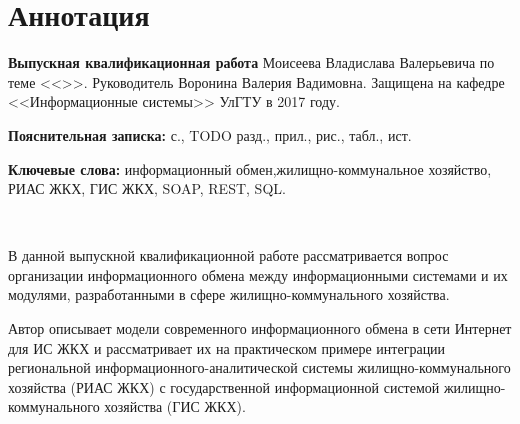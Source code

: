 
\section*{Аннотация}

\textbf{Выпускная квалификационная работа} Моисеева Владислава Валерьевича по теме <<\WorkName>>.
Руководитель Воронина Валерия Вадимовна.
Защищена на кафедре <<Информационные системы>> УлГТУ в 2017 году.

\textbf{Пояснительная записка:}  с.,  TODO разд.,  прил.,  рис.,  табл.,  ист.

\textbf{Ключевые слова:} информационный обмен,\linebreak жилищно-коммунальное хозяйство, РИАС ЖКХ, ГИС ЖКХ, SOAP, REST, SQL.

~

В данной выпускной квалификационной работе рассматривается вопрос организации информационного обмена между информационными системами и их модулями, разработанными в сфере жилищно-коммунального хозяйства.

Автор описывает модели современного информационного обмена в сети Интернет для ИС ЖКХ и рассматривает их на практическом примере интеграции региональной информационного-аналитической системы жилищно-коммунального хозяйства (РИАС ЖКХ) с государственной информационной системой жилищно-коммунального хозяйства (ГИС ЖКХ).

\newpage
\listoffigures

\clearpage
\newpage